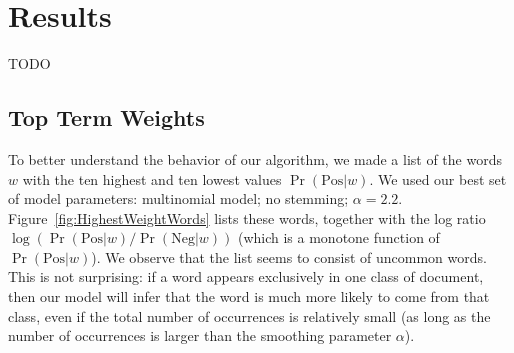 \documentclass{article}
\newcommand{\PosC}{\mathrm{Pos}}
\newcommand{\NegC}{\mathrm{Neg}}
\begin{document}
\section{Results}
\label{sec:Results}

TODO

\subsection{Top Term Weights}
\label{sec:TopWords}


To better understand the behavior of our algorithm, we made a list of the words \(w\) with the ten highest and ten lowest values \(\Pr(\PosC|w)\).
We used our best set of model parameters: multinomial model; no stemming; \(\alpha=2.2\).
Figure~\ref{fig:HighestWeightWords} lists these words, together with the log ratio \(\log(\Pr(\PosC|w) / \Pr(\NegC|w))\) (which is a monotone function of \(\Pr(\PosC|w)\)).
We observe that the list seems to consist of uncommon words.
This is not surprising: if a word appears exclusively in one class of document, then our model will infer that the word is much more likely to come from that class, even if the total number of occurrences is relatively small (as long as the number of occurrences is larger than the smoothing parameter \(\alpha\)).
\end{document}
